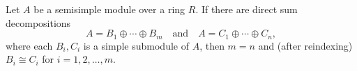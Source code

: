 Let $A$ be a semisimple module over a ring $R$. If there are direct sum decompositions
$$A = B_1 \oplus \cdots \oplus B_m \quad \text{and} \quad A = C_1 \oplus \cdots \oplus C_n,$$
where each $B_i, C_i$ is a simple submodule of $A$, then $m = n$ and (after reindexing) $B_i \cong C_i$ for $i = 1, 2, \ldots, m$.

